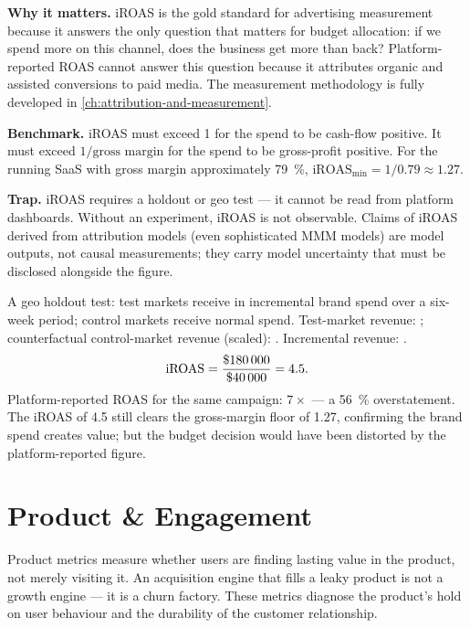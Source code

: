 \textbf{Why it matters.} iROAS is the gold standard for advertising measurement because it
answers the only question that matters for budget allocation: if we spend  more on
this channel, does the business get more than  back? Platform-reported ROAS cannot
answer this question because it attributes organic and assisted conversions to paid media. The
measurement methodology is fully developed in \cref{ch:attribution-and-measurement}.

\textbf{Benchmark.} iROAS must exceed 1 for the spend to be cash-flow positive. It must
exceed $1/\text{gross margin}$ for the spend to be gross-profit positive. For the running
SaaS with gross margin approximately \qty{79}{\percent}, $\mathrm{iROAS}_{\min} = 1/0.79
\approx 1.27$.

\textbf{Trap.} iROAS requires a holdout or geo test --- it cannot be read from platform
dashboards. Without an experiment, iROAS is not observable. Claims of iROAS derived from
attribution models (even sophisticated MMM models) are model outputs, not causal
measurements; they carry model uncertainty that must be disclosed alongside the figure.

\begin{example}
A geo holdout test: test markets receive  in incremental brand spend over a
six-week period; control markets receive normal spend. Test-market revenue: ;
counterfactual control-market revenue (scaled): . Incremental revenue:
.
\[
  \mathrm{iROAS} = \frac{\$\num{180000}}{\$\num{40000}} = 4.5.
\]
Platform-reported ROAS for the same campaign: $7\times$ --- a \qty{56}{\percent}
overstatement. The iROAS of 4.5 still clears the gross-margin floor of 1.27, confirming the
brand spend creates value; but the budget decision would have been distorted by the
platform-reported figure.
\end{example}


\section{Product \& Engagement}

Product metrics measure whether users are finding lasting value in the product, not merely
visiting it. An acquisition engine that fills a leaky product is not a growth engine ---
it is a churn factory. These metrics diagnose the product's hold on user behaviour and
the durability of the customer relationship.

